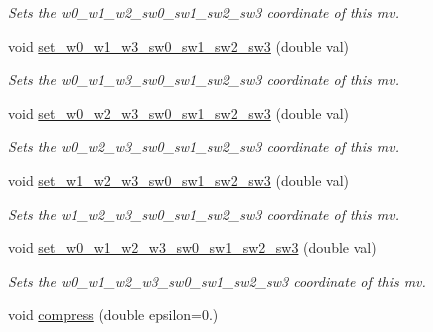 \begin{DoxyCompactItemize}
\begin{DoxyCompactList}\small\item\em Sets the w0\-\_\-w1\-\_\-w2\-\_\-sw0\-\_\-sw1\-\_\-sw2\-\_\-sw3 coordinate of this mv. \end{DoxyCompactList}\item 
\hypertarget{classe3ga_1_1mv_a93ef06889d15716ab0774d665b1a8fea}{void \hyperlink{classe3ga_1_1mv_a93ef06889d15716ab0774d665b1a8fea}{set\-\_\-w0\-\_\-w1\-\_\-w3\-\_\-sw0\-\_\-sw1\-\_\-sw2\-\_\-sw3} (double val)}\label{classe3ga_1_1mv_a93ef06889d15716ab0774d665b1a8fea}

\begin{DoxyCompactList}\small\item\em Sets the w0\-\_\-w1\-\_\-w3\-\_\-sw0\-\_\-sw1\-\_\-sw2\-\_\-sw3 coordinate of this mv. \end{DoxyCompactList}\item 
\hypertarget{classe3ga_1_1mv_a4e1ebbe2a35e631f07ecb03401cf4018}{void \hyperlink{classe3ga_1_1mv_a4e1ebbe2a35e631f07ecb03401cf4018}{set\-\_\-w0\-\_\-w2\-\_\-w3\-\_\-sw0\-\_\-sw1\-\_\-sw2\-\_\-sw3} (double val)}\label{classe3ga_1_1mv_a4e1ebbe2a35e631f07ecb03401cf4018}

\begin{DoxyCompactList}\small\item\em Sets the w0\-\_\-w2\-\_\-w3\-\_\-sw0\-\_\-sw1\-\_\-sw2\-\_\-sw3 coordinate of this mv. \end{DoxyCompactList}\item 
\hypertarget{classe3ga_1_1mv_a7873b90e9a700e237c789d3261e766c3}{void \hyperlink{classe3ga_1_1mv_a7873b90e9a700e237c789d3261e766c3}{set\-\_\-w1\-\_\-w2\-\_\-w3\-\_\-sw0\-\_\-sw1\-\_\-sw2\-\_\-sw3} (double val)}\label{classe3ga_1_1mv_a7873b90e9a700e237c789d3261e766c3}

\begin{DoxyCompactList}\small\item\em Sets the w1\-\_\-w2\-\_\-w3\-\_\-sw0\-\_\-sw1\-\_\-sw2\-\_\-sw3 coordinate of this mv. \end{DoxyCompactList}\item 
\hypertarget{classe3ga_1_1mv_a19808b20c508680fe24988f08185de2a}{void \hyperlink{classe3ga_1_1mv_a19808b20c508680fe24988f08185de2a}{set\-\_\-w0\-\_\-w1\-\_\-w2\-\_\-w3\-\_\-sw0\-\_\-sw1\-\_\-sw2\-\_\-sw3} (double val)}\label{classe3ga_1_1mv_a19808b20c508680fe24988f08185de2a}

\begin{DoxyCompactList}\small\item\em Sets the w0\-\_\-w1\-\_\-w2\-\_\-w3\-\_\-sw0\-\_\-sw1\-\_\-sw2\-\_\-sw3 coordinate of this mv. \end{DoxyCompactList}\item 
\hypertarget{classe3ga_1_1mv_ae5dc8305abad05683cb3b0ab748b29c5}{void \hyperlink{classe3ga_1_1mv_ae5dc8305abad05683cb3b0ab748b29c5}{compress} (double epsilon=0.)}\label{classe3ga_1_1mv_ae5dc8305abad05683cb3b0ab748b29c5}


\end{DoxyCompactItemize}
